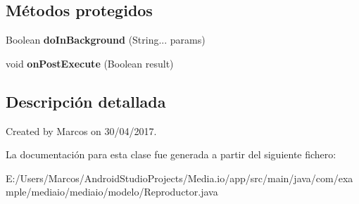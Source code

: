 \subsection*{Métodos protegidos}
\begin{DoxyCompactItemize}
\item 
\mbox{\label{classcom_1_1example_1_1mediaio_1_1mediaio_1_1modelo_1_1_reproductor_abdb55b99e85a2b7a4e8e20d90f50a624}} 
Boolean {\bfseries do\+In\+Background} (String... params)
\item 
\mbox{\label{classcom_1_1example_1_1mediaio_1_1mediaio_1_1modelo_1_1_reproductor_a74d2e94a28189ed5bc2a699c71a29b3a}} 
void {\bfseries on\+Post\+Execute} (Boolean result)
\end{DoxyCompactItemize}


\subsection{Descripción detallada}
Created by Marcos on 30/04/2017. 

La documentación para esta clase fue generada a partir del siguiente fichero\+:\begin{DoxyCompactItemize}
\item 
E\+:/\+Users/\+Marcos/\+Android\+Studio\+Projects/\+Media.\+io/app/src/main/java/com/example/mediaio/mediaio/modelo/Reproductor.\+java\end{DoxyCompactItemize}
